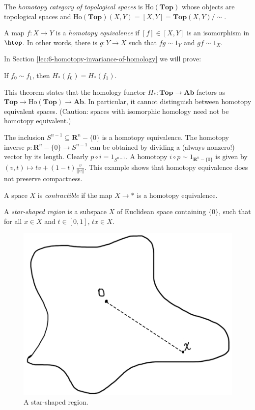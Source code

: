 \begin{definition}
The \emph{homotopy category of topological spaces} is $\mathrm{Ho}(\mathbf{Top})$ whose objects are topological spaces and $\mathrm{Ho}(\mathbf{Top})(X,Y)=[X,Y]=\mathbf{Top}(X,Y)/\sim$.
\end{definition}
\begin{definition}
	A map $f:X\to Y$ is a \emph{homotopy equivalence} if $[f]\in[X,Y]$ is an isomorphism in $\htop$. In other words, there is $g:Y\to X$ such that $fg\sim 1_Y$ and $gf\sim 1_X$.
\end{definition}

In Section \ref{lec:6-homotopy-invariance-of-homology} we will prove:
\begin{theorem}
	If $f_0\sim f_1$, then $ H_\ast(f_0)= H_\ast(f_1)$.
\end{theorem}
This theorem states that the homology functor $H_\ast:\mathbf{Top}\to\mathbf{Ab}$ factors as $\mathbf{Top}\to\mathrm{Ho}(\mathbf{Top})\to\mathbf{Ab}$. In particular, it cannot distinguish between homotopy equivalent spaces. (Caution: spaces with isomorphic homology need not be homotopy equivalent.)
\begin{example}\label{exa:homotopy-equivalence-sphere}
The inclusion $S^{n-1}\subseteq \mathbf{R}^n-\{0\}$ is a homotopy equivalence. The homotopy inverse $p:\mathbf{R}^n-\{0\}\to S^{n-1}$ can be obtained by dividing a (always nonzero!) vector by its length. Clearly $p\circ i=1_{S^{n-1}}$. A homotopy $i\circ p\sim 1_{\mathbf{R}^n-\{0\}}$ is given by $(v,t)\mapsto tv+(1-t)\frac{v}{||v||}$. This example shows that homotopy equivalence does not preserve compactness.
\end{example}
\begin{definition}
A space $X$ is \emph{contractible} if the map $X\to\ast$ is a homotopy equivalence.
\end{definition}

\begin{definition}
	A \emph{star-shaped region} is a subspace $X$ of Euclidean space containing $\{0\}$, such that for all $x\in X$ and $t\in[0,1]$, $tx\in X$. 
\end{definition}
\begin{figure}
	\centering
	\includegraphics[width=0.4\linewidth]{assets/L05/05-star-shaped-region}
	\caption{A star-shaped region.}
	\label{fig:05-star-shaped-region}
\end{figure}


